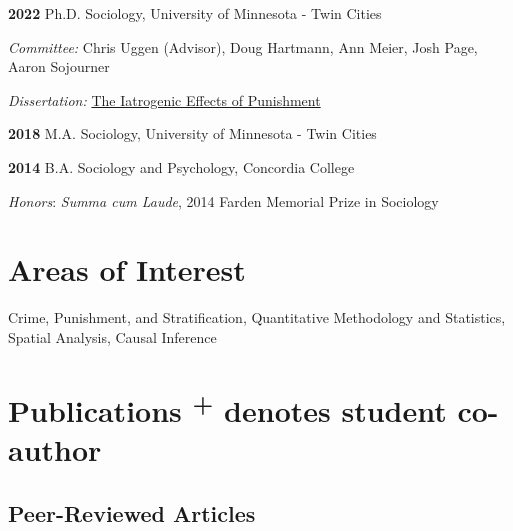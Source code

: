 \documentclass[letterpaper]{article}
\newenvironment{publist}{%
  \begin{list}{}{%
    \setlength{\leftmargin}{0cm}   %
    \setlength{\labelwidth}{2cm}     %
    \setlength{\labelsep}{0.5cm}     %
  }%
}{%
  \end{list}%
}
\renewenvironment{itemize}{
  \begin{list}{}{
    \setlength{\leftmargin}{1.5em}
  }
}{
  \end{list}
}
\begin{document}
\begin{publist}
  \item[\textbf{2022}] Ph.D. Sociology, University of Minnesota - Twin Cities
   \begin{itemize}
	\item \textit{Committee:} Chris Uggen (Advisor),  Doug Hartmann, Ann Meier, Josh Page, Aaron Sojourner 
           \item \textit{Dissertation:} \href{https://conservancy.umn.edu/bitstream/handle/11299/243159/Larson_umn_0130E_23712.pdf?sequence=1}{The Iatrogenic Effects of Punishment}
\end{itemize}
    
\item[\textbf{2018}] M.A. Sociology, University of Minnesota - Twin Cities

\item[\textbf{2014}] B.A. Sociology and Psychology, Concordia College
 \begin{itemize}
     \item \textit{Honors}: \textit{Summa cum Laude}, 2014 Farden Memorial Prize in Sociology
    \end{itemize}
\end{publist}

\section*{\textbf{Areas of Interest}}

Crime, Punishment, and Stratification, Quantitative Methodology and Statistics, Spatial Analysis, Causal Inference


\section*{\textbf{Publications} \scriptsize{\textsuperscript{+} denotes student co-author}} 

\subsection*{Peer-Reviewed Articles}
\end{document}
